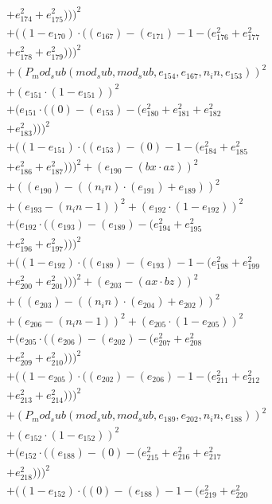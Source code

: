 \documentclass[10pt, a4paper]{article}
\begin{document}
\begin{small}
\begin{align*}
& + e_{174}^{2} + e_{175}^{2})))^{2} \\
& + ((1 - e_{170})  \cdot  ((e_{167}) - (e_{171}) - 1 - (e_{176}^{2} + e_{177}^{2} \\
& + e_{178}^{2} + e_{179}^{2})))^{2} \\
& + (P_mod_sub(mod_sub, mod_sub, e_{154}, e_{167}, n_in, e_{153}))^{2} \\
& + (e_{151}  \cdot  (1 - e_{151}))^{2} \\
& + (e_{151}  \cdot  ((0) - (e_{153}) - (e_{180}^{2} + e_{181}^{2} + e_{182}^{2} \\
& + e_{183}^{2})))^{2} \\
& + ((1 - e_{151})  \cdot  ((e_{153}) - (0) - 1 - (e_{184}^{2} + e_{185}^{2} \\
& + e_{186}^{2} + e_{187}^{2})))^{2} + (e_{190} - (bx  \cdot  az))^{2} \\
& + ((e_{190}) - ((n_in)  \cdot  (e_{191}) + e_{189}))^{2} \\
& + (e_{193} - (n_in - 1))^{2} + (e_{192}  \cdot  (1 - e_{192}))^{2} \\
& + (e_{192}  \cdot  ((e_{193}) - (e_{189}) - (e_{194}^{2} + e_{195}^{2} \\
& + e_{196}^{2} + e_{197}^{2})))^{2} \\
& + ((1 - e_{192})  \cdot  ((e_{189}) - (e_{193}) - 1 - (e_{198}^{2} + e_{199}^{2} \\
& + e_{200}^{2} + e_{201}^{2})))^{2} + (e_{203} - (ax  \cdot  bz))^{2} \\
& + ((e_{203}) - ((n_in)  \cdot  (e_{204}) + e_{202}))^{2} \\
& + (e_{206} - (n_in - 1))^{2} + (e_{205}  \cdot  (1 - e_{205}))^{2} \\
& + (e_{205}  \cdot  ((e_{206}) - (e_{202}) - (e_{207}^{2} + e_{208}^{2} \\
& + e_{209}^{2} + e_{210}^{2})))^{2} \\
& + ((1 - e_{205})  \cdot  ((e_{202}) - (e_{206}) - 1 - (e_{211}^{2} + e_{212}^{2} \\
& + e_{213}^{2} + e_{214}^{2})))^{2} \\
& + (P_mod_sub(mod_sub, mod_sub, e_{189}, e_{202}, n_in, e_{188}))^{2} \\
& + (e_{152}  \cdot  (1 - e_{152}))^{2} \\
& + (e_{152}  \cdot  ((e_{188}) - (0) - (e_{215}^{2} + e_{216}^{2} + e_{217}^{2} \\
& + e_{218}^{2})))^{2} \\
& + ((1 - e_{152})  \cdot  ((0) - (e_{188}) - 1 - (e_{219}^{2} + e_{220}^{2} \\

\end{align*}
\end{small}
\end{document}
